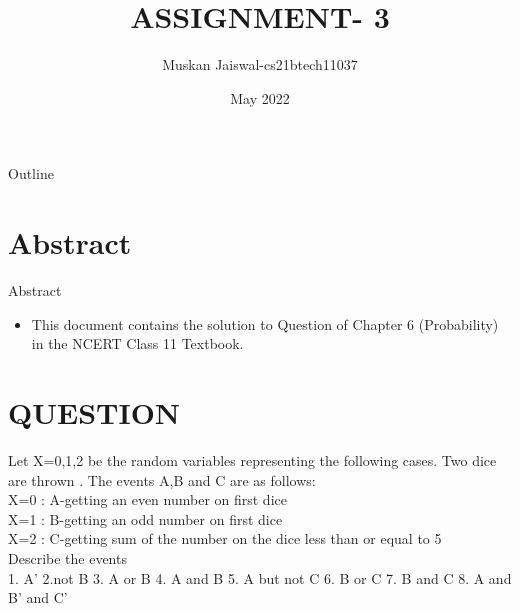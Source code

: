 \documentclass{beamer}
\title{ASSIGNMENT- 3}
\author{Muskan Jaiswal-cs21btech11037}
\date{May 2022}
\begin{document}
\begin{frame}
		\titlepage
	\end{frame}

\begin{frame}{Outline}
  \tableofcontents
\end{frame}

\section{Abstract}
	\begin{frame}{Abstract}
		\begin{itemize}
			\item 	This document contains the solution to Question of Chapter 6 (Probability) in the NCERT Class 11 Textbook.
		\end{itemize}
	\end{frame}


\section{QUESTION}
\begin{frame}{}
\begin{block}{}

Let X=0,1,2 be the random variables representing the following cases.
Two dice are thrown . The events A,B and C are as follows:\\
X=0 : A-getting an even number on first dice\\
X=1 : B-getting an odd number on first dice\\
X=2 : C-getting sum of the number on the dice less than or equal to 5\\
Describe the events\\
1. A'  2.not B 3.  A or B  4. A and B 5. A but not C 6. B or C 7. B and C  8. A and B' and C'\\
\end{block}
\end{frame}
\end{document}
